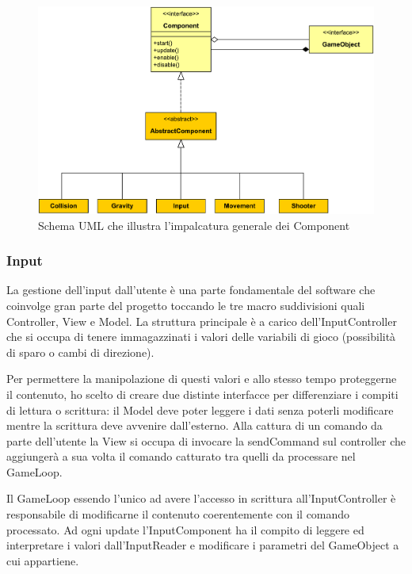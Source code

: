 \documentclass[a4paper,12pt]{report}
\begin{document}
\begin{figure}[H]
\includegraphics[width=\linewidth]{img/component}
\caption{Schema UML che illustra l'impalcatura generale dei Component}
\label{img:component}
\end{figure}

\subsubsection*{Input}

La gestione dell'input dall'utente è una parte fondamentale del software che coinvolge gran parte del progetto toccando le tre macro suddivisioni quali Controller, View e Model.
La struttura principale è a carico dell'InputController che si occupa di tenere immagazzinati i valori delle variabili di gioco (possibilità di sparo o cambi di direzione).

Per permettere la manipolazione di questi valori e allo stesso tempo proteggerne il contenuto, ho scelto di creare due distinte interfacce per differenziare i compiti di lettura o scrittura: il Model deve poter leggere i dati senza poterli modificare mentre la scrittura deve avvenire dall'esterno.
Alla cattura di un comando da parte dell'utente la View si occupa di invocare la sendCommand sul controller che aggiungerà a sua volta il comando catturato tra quelli da processare nel GameLoop.

Il GameLoop essendo l'unico ad avere l'accesso in scrittura all'InputController è responsabile di modificarne il contenuto coerentemente con il comando processato.
Ad ogni update l'InputComponent ha il compito di leggere ed interpretare i valori dall'InputReader e modificare i parametri del GameObject a cui appartiene.
\end{document}
